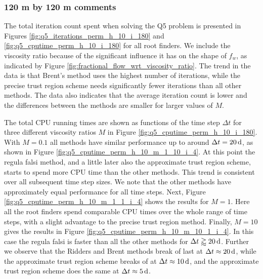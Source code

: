 \subsubsection{120 m by 120 m comments}
The total iteration count spent when solving the Q5 problem is presented in Figures \ref{fig:q5_iterations_perm_h_10_i_180} and \ref{fig:q5_cputime_perm_h_10_i_180} for all root finders. We include the viscosity ratio because of the significant influence it has on the shape of $f_w$, as indicated by Figure \ref{fig:fractional_flow_wrt_viscosity_ratio}. The trend in the data is that Brent's method uses the highest number of iterations, while the precise trust region scheme needs significantly fewer iterations than all other methods. The data also indicates that the average iteration count is lower and the differences between the methods are smaller for larger values of $M$.


The total CPU running times are shown as functions of the time step $\Delta t$ for three different viscosity ratios $M$ in Figure \ref{fig:q5_cputime_perm_h_10_i_180}. With $M = 0.1$ all methods have similar performance up to around $\Delta t = \unit[20]{d}$, as shown in Figure \ref{fig:q5_cputime_perm_h_10_m_1_10_i_4}. At this point the regula falsi method, and a little later also the approximate trust region scheme, starts to spend more CPU time than the other methods. This trend is consistent over all subsequent time step sizes. We note that the other methods have approximately equal performance for all time steps.
Next, Figure \ref{fig:q5_cputime_perm_h_10_m_1_1_i_4} shows the results for $M = 1$. Here all the root finders spend comparable CPU times over the whole range of time steps, with a slight advantage to the precise trust region method.
Finally, $M = 10$ gives the results in Figure \ref{fig:q5_cputime_perm_h_10_m_10_1_i_4}. In this case the regula falsi is faster than all the other methods for $\Delta t \gtrapprox \unit[20]{d}$. Further we observe that the Ridders and Brent methods break of last at $\Delta t \approx \unit[20]{d}$, while the approximate trust region scheme breaks of at $\Delta t \approx \unit[10]{d}$, and the approximate trust region scheme does the same at $\Delta t \approx \unit[5]{d}$.


